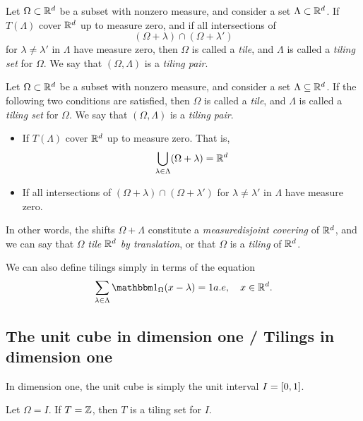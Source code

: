 \documentclass[../thesis.tex]{subfiles}
\begin{document}
\begin{definition}
    Let $\Omega \subset \mathbb{R}^d$ be a subset with nonzero measure, and consider a set $\Lambda \subset \mathbb{R}^d$. If $T(\Lambda)$ cover $\mathbb{R}^d$ up to measure zero, and if all intersections of 
    \begin{equation*}  %
        (\Omega+\lambda) \cap (\Omega+\lambda')
    \end{equation*}
    for $\lambda\neq \lambda'$ in $\Lambda$ have measure zero, then $\Omega$ is called a \emph{tile}, and $\Lambda$ is called a \emph{tiling set} for $\Omega$. We say that $(\Omega, \Lambda)$ is a \emph{tiling pair}. 
\end{definition}
\begin{definition}
    Let $\Omega \subset \mathbb{R}^d$ be a subset with nonzero measure, and consider a set $\Lambda \subseteq \mathbb{R}^d$. If the following two conditions are satisfied, then $\Omega$ is called a \emph{tile}, and $\Lambda$ is called a \emph{tiling set} for $\Omega$. We say that $(\Omega, \Lambda)$ is a \emph{tiling pair}. 
    \begin{itemize}
        \item If $T(\Lambda)$ cover $\mathbb{R}^d$ up to measure zero. That is,  %
        \begin{equation*}
            \bigcup_{\lambda \in \Lambda} (\Omega + \lambda) = \mathbb{R}^d
        \end{equation*}
        \item If all intersections of $(\Omega+\lambda) \cap (\Omega+\lambda')$ for $\lambda\neq \lambda'$ in $\Lambda$ have measure zero. %
    \end{itemize}
\end{definition}

In other words, the shifts $\Omega + \Lambda$ constitute a \emph{measuredisjoint covering} of $\mathbb{R}^d$, and we can say that $\Omega$ \emph{tile} $\mathbb{R}^d$ \emph{by translation}, or that $\Omega$ is a \emph{tiling} of $\mathbb{R}^d$. 

We can also define tilings simply in terms of the equation
\begin{equation*}
    \sum_{\lambda \in \Lambda} \indicator{\Omega}{x-\lambda} = 1 \space a.e , \quad x \in \R^d.
\end{equation*}





\subsection{The unit cube in dimension one / Tilings in dimension one}
In dimension one, the unit cube is simply the unit interval $I=[0,1]$.
\begin{theorem}  %
    Let $\Omega = I$. If $T=\mathbb{Z}$, then $T$ is a tiling set for $I$.
\end{theorem}
\end{document}
